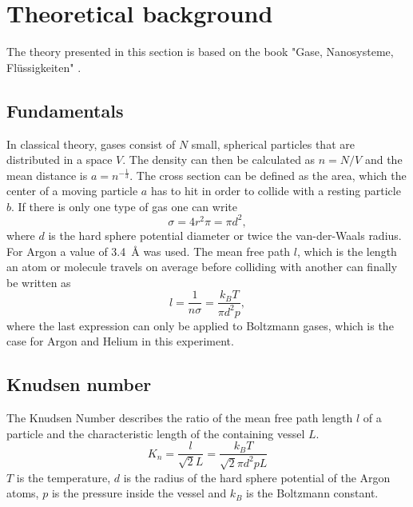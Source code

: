 \documentclass[a4paper,10pt]{article}
\begin{document}
\section{Theoretical background}
The theory presented in this section is based on the book "Gase, Nanosysteme, Flüssigkeiten" \cite{bergmann}. 

\subsection{Fundamentals}
In classical theory, gases consist of $N$ small, spherical particles  that are distributed in a space $V$. The density can then be calculated as $n = N / V$ and the mean distance is $a = n^{-\frac{1}{3}}$. The cross section can be defined as the area, which the center of a moving particle $a$ has to hit in order to collide with a resting particle $b$. If there is only one type of gas one can write 
\begin{equation}
	\sigma = 4 r^2 \pi =\pi d^2,
\end{equation}
where $d$ is the hard sphere potential diameter or twice the van-der-Waals radius. For Argon a value of \SI{3.4}{\angstrom} \cite{bergmann} was used. The mean free path $l$, which is the length an atom or molecule travels on average before colliding with another can finally be written as 
\begin{equation}
	l = \frac{1}{n \sigma} = \frac{k_B T}{\pi d^2 p},
\end{equation}
where the last expression can only be applied to Boltzmann gases, which is the case for Argon and Helium in this experiment. 
\subsection{Knudsen number}
The Knudsen Number describes the ratio of the mean free path length $l$ of a particle and the characteristic length of the containing vessel $L$.
\begin{equation}
  K_n = \frac{l}{\sqrt{2} L} = \frac{k_B T }{\sqrt{2} \pi d^2 p L}
\end{equation}
$T$ is the temperature, $d$ is the radius of the hard sphere potential of the Argon atoms, $p$ is the pressure inside the vessel and $k_B$ is the Boltzmann constant.
\end{document}
